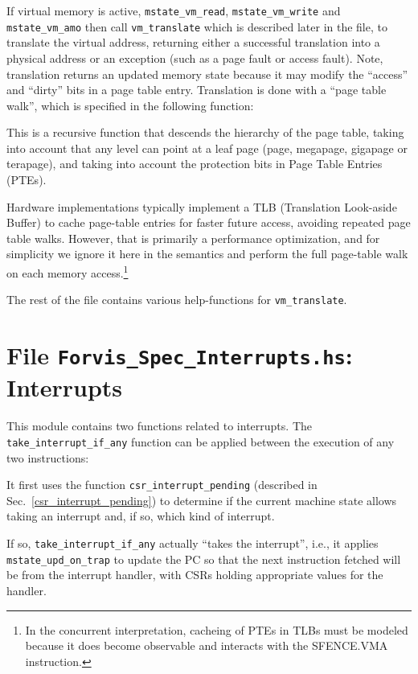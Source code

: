 \documentclass[11pt]{article}
\begin{document}
If virtual memory is active, \verb|mstate_vm_read|,
\verb|mstate_vm_write| and \verb|mstate_vm_amo| then call
\verb|vm_translate| which is described later in the file, to translate
the virtual address, returning either a successful translation into a
physical address or an exception (such as a page fault or access
fault).  Note, translation returns an updated memory state because it
may modify the ``access'' and ``dirty'' bits in a page table entry.
Translation is done with a ``page table walk'', which is specified in
the following function:



This is a recursive function that descends the hierarchy of the page
table, taking into account that any level can point at a leaf page
(page, megapage, gigapage or terapage), and taking into account the
protection bits in Page Table Entries (PTEs).

Hardware implementations typically implement a TLB (Translation
Look-aside Buffer) to cache page-table entries for faster future
access, avoiding repeated page table walks.  However, that is
primarily a performance optimization, and for simplicity we ignore it
here in the semantics and perform the full page-table walk on each
memory access.\footnote{In the concurrent interpretation, cacheing of
PTEs in TLBs must be modeled because it does become observable and
interacts with the SFENCE.VMA instruction.}

The rest of the file contains various help-functions for \verb|vm_translate|.


\section{File {\tt Forvis\_Spec\_Interrupts.hs}: Interrupts}

\label{sec_interrupts}

This module contains two functions related to interrupts.  The
\verb|take_interrupt_if_any| function can be applied between the
execution of any two instructions:



It first uses the function \verb|csr_interrupt_pending| (described in
Sec.~\ref{csr_interrupt_pending}) to determine if the current machine
state allows taking an interrupt and, if so, which kind of interrupt.

If so, \verb|take_interrupt_if_any| actually ``takes the interrupt'',
i.e., it applies \verb|mstate_upd_on_trap| to update the PC so that
the next instruction fetched will be from the interrupt handler, with
CSRs holding appropriate values for the handler.
\end{document}
